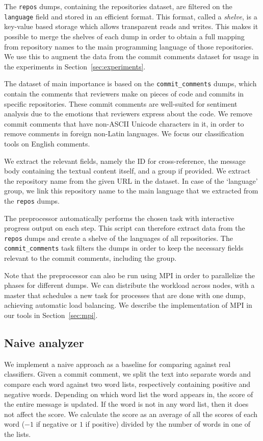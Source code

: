 \documentclass{article}
\begin{document}
The {\tt repos} dumps, containing the repositories dataset, are filtered on the 
{\tt language} field and stored in an efficient format. This format, called a
\emph{shelve}, is a key-value based storage which allows transparent reads and 
writes. This makes it possible to merge the shelves of each dump in order to 
obtain a full mapping from repository names to the main programming language of 
those repositories. We use this to augment the data from the commit comments
dataset for usage in the experiments in Section~\ref{sec:experiments}.

The dataset of main importance is based on the {\tt commit\_comments} dumps, 
which contain the comments that reviewers make on pieces of code and commits in 
specific repositories. These commit comments are well-suited for sentiment 
analysis due to the emotions that reviewers express about the code. We remove
commit comments that have non-ASCII Unicode characters in it, in order to
remove comments in foreign non-Latin languages. We focus our classification
tools on English comments.

We extract the relevant fields, namely the ID for cross-reference, the message 
body containing the textual content itself, and a group if provided. We extract 
the repository name from the given URL in the dataset. In case of the 
`language' group, we link this repository name to the main language that we 
extracted from the {\tt repos} dumps.

The preprocessor automatically performs the chosen task with interactive 
progress output on each step. This script can therefore extract data from the
{\tt repos} dumps and create a shelve of the languages of all repositories. The
{\tt commit\_comments} task filters the dumps in order to keep the necessary
fields relevant to the commit comments, including the group.

Note that the preprocessor can also be run using MPI in order to parallelize 
the phases for different dumps. We can distribute the workload across nodes, 
with a master that schedules a new task for processes that are done with one 
dump, achieving automatic load balancing. We describe the implementation of MPI 
in our tools in Section~\ref{sec:mpi}.

\subsection{Naive analyzer}\label{sec:analyzer}
We implement a naive approach as a baseline for comparing against real 
classifiers. Given a commit comment, we split the text into separate words and 
compare each word against two word lists, respectively containing positive and 
negative words. Depending on which word list the word appears in, the score of 
the entire message is updated. If the word is not in any word list, then it 
does not affect the score. We calculate the score as an average of all the 
scores of each word ($-1$ if negative or $1$ if positive) divided by the number 
of words in one of the lists.
\end{document}
